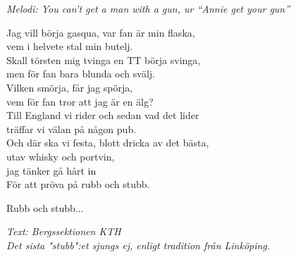 {\footnotesize\textit{Melodi: You can't get a man with a gun, ur ``Annie get your gun''}}\par
\vspace{10pt}
Jag vill börja gasqua, var fan är min flaska,\\
vem i helvete stal min butelj.\\
Skall törsten mig tvinga en TT börja svinga,\\
men för fan bara blunda och svälj.\\
Vilken smörja, får jag spörja,\\
vem för fan tror att jag är en älg?\\
Till England vi rider och sedan vad det lider\\
träffar vi välan på någon pub.\\
Och där ska vi festa, blott dricka av det bästa,\\
utav whisky och portvin, \\
jag tänker gå hårt in\\
För att pröva på rubb och stubb.\par
\vspace{10pt}
Rubb och stubb...\par
\vspace{10pt}
{\footnotesize\textit{Text: Bergssektionen KTH\\
Det sista "stubb":et sjungs ej, enligt tradition från Linköping.}}
